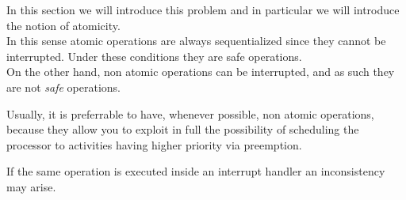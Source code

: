 In this section we will introduce this problem and in particular we will introduce the notion of atomicity.\\
In this sense atomic operations are always sequentialized since they cannot be interrupted. Under these conditions they are safe operations.\\
On the other hand, non atomic operations can be interrupted, and as such they are not \textit{safe} operations.

Usually, it is preferrable to have, whenever possible, non atomic operations, because they allow you to exploit in full the possibility of scheduling the processor to activities having higher priority via preemption.

If the same operation is executed inside an interrupt handler an inconsistency may arise.

